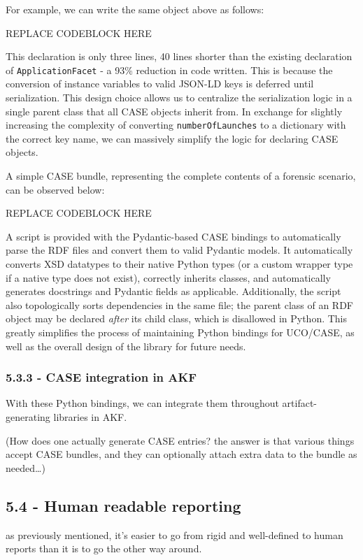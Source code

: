 For example, we can write the same object above as follows:

REPLACE CODEBLOCK HERE

This declaration is only three lines, 40 lines shorter than the existing
declaration of \texttt{ApplicationFacet} - a 93\% reduction in code
written. This is because the conversion of instance variables to valid
JSON-LD keys is deferred until serialization. This design choice allows
us to centralize the serialization logic in a single parent class that
all CASE objects inherit from. In exchange for slightly increasing the
complexity of converting \texttt{numberOfLaunches} to a dictionary with
the correct key name, we can massively simplify the logic for declaring
CASE objects.

A simple CASE bundle, representing the complete contents of a forensic
scenario, can be observed below:

REPLACE CODEBLOCK HERE

A script is provided with the Pydantic-based CASE bindings to
automatically parse the RDF files and convert them to valid Pydantic
models. It automatically converts XSD datatypes to their native Python
types (or a custom wrapper type if a native type does not exist),
correctly inherits classes, and automatically generates docstrings and
Pydantic fields as applicable. Additionally, the script also
topologically sorts dependencies in the same file; the parent class of
an RDF object may be declared \emph{after} its child class, which is
disallowed in Python. This greatly simplifies the process of maintaining
Python bindings for UCO/CASE, as well as the overall design of the
library for future needs.

\subsubsection{5.3.3 - CASE integration in
AKF}\label{case-integration-in-akf}

With these Python bindings, we can integrate them throughout
artifact-generating libraries in AKF.

(How does one actually generate CASE entries? the answer is that various
things accept CASE bundles, and they can optionally attach extra data to
the bundle as needed\ldots)

\subsection{5.4 - Human readable
reporting}\label{human-readable-reporting}

as previously mentioned, it's easier to go from rigid and well-defined
to human reports than it is to go the other way around.
